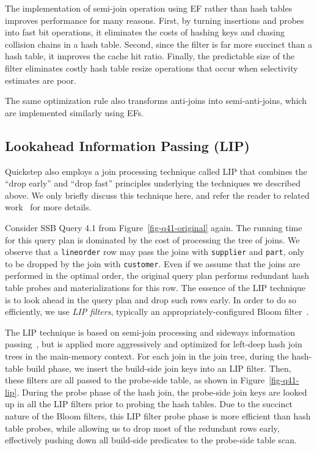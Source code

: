 The implementation of semi-join operation using EF rather than hash tables improves performance for many reasons. First, by turning insertions and probes into fast bit operations, it eliminates the costs of hashing keys and chasing collision chains in a hash table. Second, since the filter is far more succinct than a hash table, it improves the cache hit ratio. Finally, the predictable size of the filter eliminates costly hash table resize operations that occur when selectivity estimates are poor.

The same optimization rule also transforms anti-joins into semi-anti-joins, which are implemented similarly using EFs.

\subsection{Lookahead Information Passing (LIP)} \label{sec:lip}
Quickstep also employs a join processing technique called LIP that combines the ``drop early'' and ``drop fast'' principles underlying the techniques we described above. We only briefly discuss this technique here, and refer the reader to related work~\cite{DBLP:journals/pvldb/ZhuPSP17} for more details.

Consider SSB Query 4.1 from Figure~\ref{fig-q41-original} again. The running time for this query plan is dominated by the cost of processing the tree of joins. We observe that a \texttt{lineorder} row may pass the joins with \texttt{supplier} and \texttt{part}, only to be dropped by the join with \texttt{customer}. Even if we assume that the joins are performed in the optimal order, the original query plan performs redundant hash table probes and materializations for this row. The essence of the LIP technique is to look ahead in the query plan and drop such rows early. In order to do so efficiently, we use \emph{LIP filters}, typically an appropriately-configured Bloom filter~\cite{Bloom70Space}.

The LIP technique is based on semi-join processing and sideways information passing~\cite{Bernstein1981SemiJoin, Ives2008Sideways, Beeri1987Magic}, but is applied more aggressively and optimized for left-deep hash join trees in the main-memory context. For each join in the join tree, during the hash-table build phase, we insert the build-side join keys into an LIP filter. Then, these filters are all passed to the probe-side table, as shown in Figure~\ref{fig-q41-lip}. During the probe phase of the hash join, the probe-side join keys are looked up in all the LIP filters prior to probing the hash tables. Due to the succinct nature of the Bloom filters, this LIP filter probe phase is more efficient than hash table probes, while allowing us to drop most of the redundant rows early, %
effectively pushing down all build-side predicates to the probe-side table scan.

